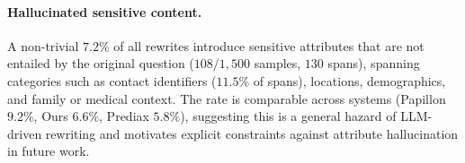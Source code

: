 \paragraph{Hallucinated sensitive content.}
A non-trivial $7.2\%$ of all rewrites introduce sensitive attributes
that are not entailed by the original question
($108 / 1{,}500$ samples, $130$ spans), spanning categories such as
contact identifiers ($11.5\%$ of spans), locations, demographics, and
family or medical context. The rate is comparable across systems
(Papillon $9.2\%$, Ours $6.6\%$, Prediax $5.8\%$), suggesting this is
a general hazard of LLM-driven rewriting and motivates explicit
constraints against attribute hallucination in future work.


\newcommand{\best}[1]{\textbf{#1}}                  %
\newcommand{\sbest}[1]{\underline{#1}}              %
\newcommand{\aggrhead}[2]{%
  \rowcolor{#1}\multicolumn{12}{c}{\textbf{#2}}\\}
\newcommand{\todofill}{{\color{gray!70}?}}          %

